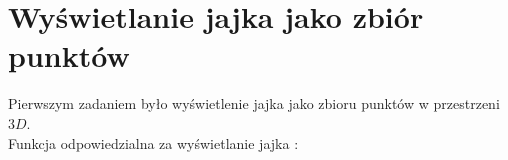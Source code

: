 \documentclass[wide,a4paper,titlepage,12pt] {article}
\begin{document}
\section{Wyświetlanie jajka jako zbiór punktów}
Pierwszym zadaniem było wyświetlenie jajka jako zbioru punktów w przestrzeni $3D$.\\
Funkcja odpowiedzialna za wyświetlanie jajka : \\
\lstset{ %
    language=c++,                %
    basicstyle=\scriptsize,       %
    numbers=left,                   %
    numberstyle=\scriptsize,      %
    stepnumber=10,                   %
    numbersep=9pt,                  %
    showspaces=false,               %
    showstringspaces=false,         %
    showtabs=false,                 %
    breaklines=true,                %
    }
    
\end{document}
